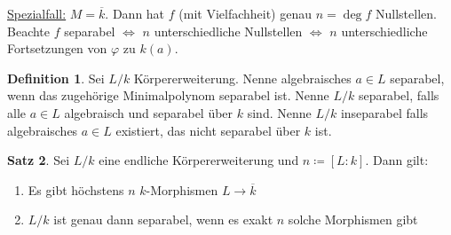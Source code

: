 \documentclass[12pt,parskip=full]{scrartcl}
\newcommand{\heading}{\underline}
\theoremstyle{definition}
\newtheorem{theorem}{Satz}[section]
\newtheorem{definition}[theorem]{Definition}
\theoremstyle{remark}
\begin{document}
	\heading{Spezialfall:} $M = \overline{k}$. Dann hat $f$ (mit Vielfachheit) genau $n = \deg f$ Nullstellen. Beachte $f$ separabel $\Leftrightarrow$ $n$ unterschiedliche Nullstellen $\Leftrightarrow$ $n$ unterschiedliche Fortsetzungen von $\varphi$ zu $k(a)$.
	
	\begin{definition}
		Sei $L/k$ Körpererweiterung. Nenne algebraisches $a \in L$ separabel, wenn das zugehörige Minimalpolynom separabel ist. Nenne $L/k$ separabel, falls alle $a \in L$ algebraisch und separabel über $k$ sind. Nenne $L/k$ inseparabel falls algebraisches $a \in L$ existiert, das nicht separabel über $k$ ist.
	\end{definition}

	\begin{theorem}
		Sei $L/k$ eine endliche Körpererweiterung und $n \coloneqq  [L:k]$. Dann gilt:
		\begin{enumerate}
			\item Es gibt höchstens $n$ $k$-Morphismen $L \to \overline{k}$
			\item $L/k$ ist genau dann separabel, wenn es exakt $n$ solche Morphismen gibt
		\end{enumerate}
	\end{theorem}
\end{document}
